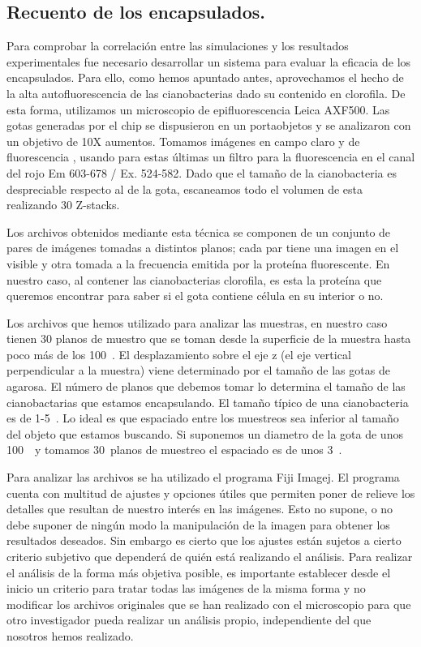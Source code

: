
\subsection{Recuento de los encapsulados.}\label{sec:analisis_datos}


Para comprobar la correlación entre las simulaciones y los resultados experimentales fue necesario desarrollar un sistema para evaluar la eficacia de los encapsulados. Para ello, como hemos apuntado antes, aprovechamos el hecho de la alta autofluorescencia de las cianobacterias dado su contenido en clorofila. De esta forma, utilizamos un microscopio de epifluorescencia Leica AXF500. Las gotas generadas por el chip se dispusieron en un portaobjetos y se analizaron con un objetivo de 10X aumentos. Tomamos imágenes en campo claro y de fluorescencia , usando para estas últimas un filtro para la fluorescencia en el canal del rojo Em 603-678 / Ex. 524-582. Dado que el tamaño de la cianobacteria es despreciable respecto al de la gota, escaneamos todo el volumen de esta realizando 30 Z-stacks. 

Los archivos obtenidos mediante esta técnica se componen de un conjunto de pares de imágenes tomadas a distintos planos; cada par tiene una imagen en el visible y otra tomada a la frecuencia emitida por la proteína fluorescente. En nuestro caso, al contener las cianobacterias clorofila, es esta la proteína que queremos encontrar para saber si el gota contiene célula en su interior o no. 

Los archivos que hemos utilizado para analizar las muestras, en nuestro caso tienen 30 planos de muestro que se toman desde la superficie de la muestra hasta poco más de los 100~\micrometro. El desplazamiento sobre el eje z (el eje vertical perpendicular a la muestra) viene determinado por el tamaño de las gotas de agarosa. El número de planos que debemos tomar lo determina el tamaño de las cianobactarias que estamos encapsulando. El tamaño típico de una cianobacteria es de 1-5~\micrometro. Lo ideal es que espaciado entre los muestreos sea inferior al tamaño del objeto que estamos buscando. Si suponemos un diametro de la gota de unos 100~\micrometro\ y tomamos 30~planos de muestreo el espaciado es de unos 3~\micrometro.

Para analizar las archivos se ha utilizado el programa Fiji Imagej. El programa cuenta con multitud de ajustes y opciones útiles que permiten poner de relieve los detalles que resultan de nuestro interés en las imágenes. Esto no supone, o no debe suponer de ningún modo la manipulación de la imagen para obtener los resultados deseados. Sin embargo es cierto que los ajustes están sujetos a cierto criterio subjetivo que dependerá de quién está realizando el análisis. Para realizar el análisis de la forma más objetiva posible, es importante establecer desde el inicio un criterio para tratar todas las imágenes de la misma forma y no modificar los archivos originales que se han realizado con el microscopio para que otro investigador pueda realizar un análisis propio, independiente del que nosotros hemos realizado.


